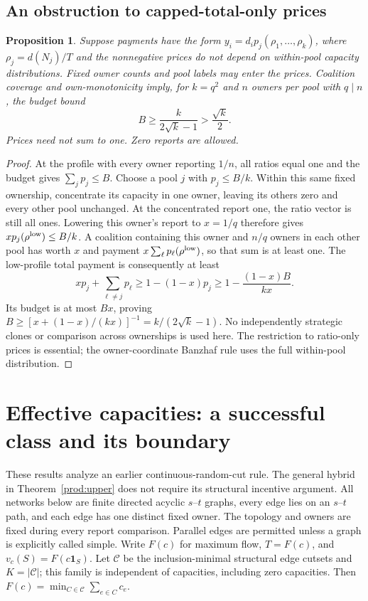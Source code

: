 \documentclass[11pt]{article}
\newtheorem{proposition}[theorem]{Proposition}
\theoremstyle{definition}\newtheorem{definition}[theorem]{Definition}
\theoremstyle{remark}\newtheorem{remark}[theorem]{Remark}
\newcommand{\ind}{\mathbf 1}
\begin{document}
\subsection{An obstruction to capped-total-only prices}
\begin{proposition}\label{hist:capped-totals}
Suppose payments have the form $y_i=d_ip_j(\rho_1,\ldots,\rho_k)$,
where $\rho_j=d(N_j)/T$ and the nonnegative prices do not depend on
within-pool capacity distributions. Fixed owner counts and pool labels
may enter the prices. Coalition coverage and own-monotonicity imply,
for $k=q^2$ and $n$ owners per pool with $q\mid n$, the budget bound
\[
 B\ge\frac{k}{2\sqrt{k}-1}>\frac{\sqrt{k}}2.
\]
Prices need not sum to one. Zero reports are allowed.
\end{proposition}
\begin{proof}
At the profile with every owner reporting $1/n$, all ratios equal one
and the budget gives $\sum_jp_j\le B$. Choose a pool $j$ with
$p_j\le B/k$. Within this same fixed ownership, concentrate its capacity
in one owner, leaving its others zero and every other pool unchanged.
At the concentrated report one, the ratio vector is still all ones.
Lowering this owner's report to $x=1/q$ therefore gives
$xp_j(\rho^{\rm low})\le B/k$. A coalition containing this owner and
$n/q$ owners in each other pool has worth $x$ and payment
$x\sum_\ell p_\ell(\rho^{\rm low})$, so that sum is at least one.
The low-profile total payment is consequently at least
\[
 xp_j+\sum_{\ell\ne j}p_\ell
 \ge1-(1-x)p_j\ge1-\frac{(1-x)B}{kx}.
\]
Its budget is at most $Bx$, proving
$B\ge[x+(1-x)/(kx)]^{-1}=k/(2\sqrt{k}-1)$.
No independently strategic clones or comparison across ownerships is
used here. The restriction to ratio-only prices is essential; the
owner-coordinate Banzhaf rule uses the full within-pool distribution.
\end{proof}

\section{Effective capacities: a successful class and its boundary}
\label{net:effective}
These results analyze an earlier continuous-random-cut rule.  The general
hybrid in Theorem~\ref{prod:upper} does not require its structural incentive
argument.  All networks below are finite directed acyclic $s$--$t$ graphs,
every edge lies on an $s$--$t$ path, and each edge has one distinct fixed owner.
The topology and owners are fixed during every report comparison.  Parallel
edges are permitted unless a graph is explicitly called simple.
Write $F(c)$ for maximum flow, $T=F(c)$, and $v_c(S)=F(c\ind_S)$.
Let $\mathcal C$ be the inclusion-minimal structural edge cutsets and
$K=|\mathcal C|$; this family is independent of capacities, including zero
capacities.  Then $F(c)=\min_{C\in\mathcal C}\sum_{e\in C}c_e$.
\end{document}
